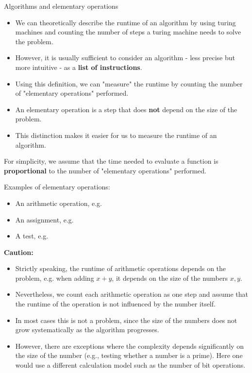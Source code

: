 \documentclass[11pt,compress,t,notes=noshow, xcolor=table]{beamer}
\begin{document}
\begin{vbframe}{Algorithms and elementary operations}

\begin{itemize}
\item We can theoretically describe the runtime of an algorithm by using turing machines and counting the number of steps a turing machine needs to solve the problem.
\item However, it is usually sufficient to consider an algorithm - less precise but more intuitive - as a \textbf{list of instructions}.
\item Using this definition, we can "measure" the runtime by counting the number of "elementary operations" performed.
\item An elementary operation is a step that does \textbf{not} depend on the size of the problem.
\item This distinction makes it easier for us to measure the runtime of an algorithm.
\end{itemize}

\framebreak

For simplicity, we assume that the time needed to evaluate a function is \textbf{proportional} to the number of "elementary operations" performed.

\lz

Examples of elementary operations:

\begin{itemize}
  \item An arithmetic operation, e.g. 
  \item An assignment, e.g. 
  \item A test, e.g. 
\end{itemize}

\framebreak

\textbf{Caution:}
\begin{itemize}
\item Strictly speaking, the runtime of arithmetic operations depends on the problem, e.g. when adding $x + y$, it depends on the size of the numbers $x, y$.
\item Nevertheless, we count each arithmetic operation as one step and assume that the runtime of the operation is not influenced by the number itself.
\item In most cases this is not a problem, since the size of the numbers does not grow systematically as the algorithm progresses.
\item However, there are exceptions where the complexity depends significantly on the size of the number (e.g., testing whether a number is a prime). Here one would use a different calculation model such as the number of bit operations.
\end{itemize}

\end{vbframe}
\end{document}
